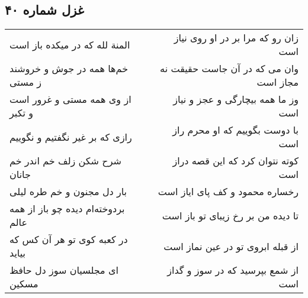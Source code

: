 \begin{center}
\section*{غزل شماره ۴۰}
\label{sec:sh040}
\begin{longtable}{l p{0.5cm} r}
المنة لله که در میکده باز است
&&
زان رو که مرا بر در او روی نیاز است
\\
خم‌ها همه در جوش و خروشند ز مستی
&&
وان می که در آن جاست حقیقت نه مجاز است
\\
از وی همه مستی و غرور است و تکبر
&&
وز ما همه بیچارگی و عجز و نیاز است
\\
رازی که بر غیر نگفتیم و نگوییم
&&
با دوست بگوییم که او محرم راز است
\\
شرح شکن زلف خم اندر خم جانان
&&
کوته نتوان کرد که این قصه دراز است
\\
بار دل مجنون و خم طره لیلی
&&
رخساره محمود و کف پای ایاز است
\\
بردوخته‌ام دیده چو باز از همه عالم
&&
تا دیده من بر رخ زیبای تو باز است
\\
در کعبه کوی تو هر آن کس که بیاید
&&
از قبله ابروی تو در عین نماز است
\\
ای مجلسیان سوز دل حافظ مسکین
&&
از شمع بپرسید که در سوز و گداز است
\\
\end{longtable}
\end{center}

